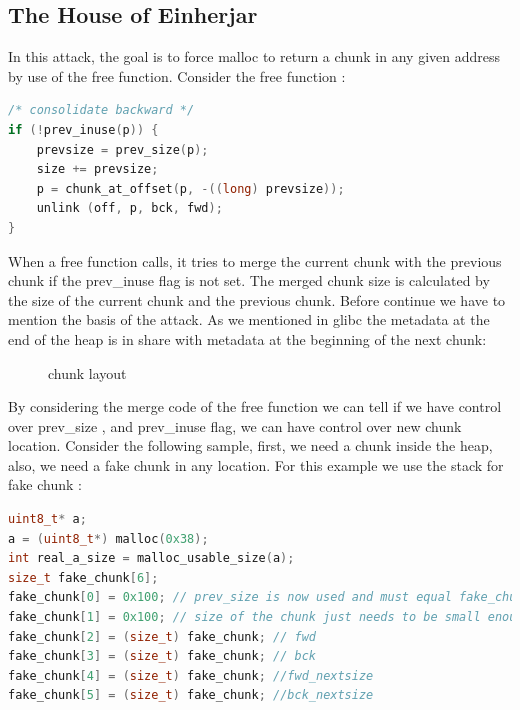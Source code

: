 \documentclass{masterthesis}
\newcommand*\libc{glibc}
\newcommand*\sbs{small bins}
\begin{document}
\subsection{The House of Einherjar}
In this attack, the goal is to force malloc to return a chunk in any given address by use of the free function. Consider the free function :

\begin{lstlisting}[language=c,frame=tlrb]
/* consolidate backward */
if (!prev_inuse(p)) {
    prevsize = prev_size(p);
    size += prevsize;
    p = chunk_at_offset(p, -((long) prevsize));
	unlink (off, p, bck, fwd);
} 
 \end{lstlisting}
When a free function calls, it tries to merge the current chunk with the previous chunk if the prev\_inuse flag is not set. The merged chunk size is calculated by the size of the current chunk and the previous chunk. Before continue we have to mention the basis of the attack. As we mentioned in \libc{} the metadata at the end of the heap is in share with metadata at the beginning of the next chunk: 

\begin{figure}[h!]
  \caption{chunk layout}
\end{figure}

By considering the merge code of the free function we can tell if we have control over prev\_size , and prev\_inuse flag, we can have control over new chunk location. 
Consider the following sample, first, we need a chunk inside the heap, also, we need a fake chunk in any location. For this example we use the stack for fake chunk :
\begin{lstlisting}[language=c,frame=tlrb]
uint8_t* a;
a = (uint8_t*) malloc(0x38);
int real_a_size = malloc_usable_size(a);
size_t fake_chunk[6];
fake_chunk[0] = 0x100; // prev_size is now used and must equal fake_chunk's size to pass P->bk->size == P->prev_size
fake_chunk[1] = 0x100; // size of the chunk just needs to be small enough to stay in the \sbs{}
fake_chunk[2] = (size_t) fake_chunk; // fwd
fake_chunk[3] = (size_t) fake_chunk; // bck
fake_chunk[4] = (size_t) fake_chunk; //fwd_nextsize
fake_chunk[5] = (size_t) fake_chunk; //bck_nextsize
 \end{lstlisting}
\end{document}
